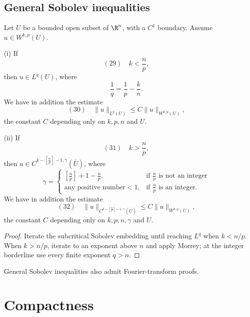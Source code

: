 \subsection{General Sobolev inequalities}

\begin{theorem}
\label{thm:general-sobolev-inequalities}
Let $U$ be a bounded open subset of $\R^n$, with a $C^1$ boundary. Assume $u \in W^{k,p}(U)$.

(i) If
$$(29) \quad k < \frac{n}{p},$$
then $u \in L^q(U)$, where
$$\frac{1}{q} = \frac{1}{p} - \frac{k}{n}.$$
We have in addition the estimate
$$(30) \quad \|u\|_{L^q(U)} \le C\|u\|_{W^{k,p}(U)},$$
the constant $C$ depending only on $k, p, n$ and $U$.

(ii) If
$$(31) \quad k > \frac{n}{p},$$
then $u \in C^{k-[\frac{n}{p}]-1,\gamma}(\bar{U})$, where
$$\gamma = \begin{cases}
\left[\frac{n}{p}\right] + 1 - \frac{n}{p}, & \text{if } \frac{n}{p} \text{ is not an integer} \\
\text{any positive number} < 1, & \text{if } \frac{n}{p} \text{ is an integer}.
\end{cases}$$
We have in addition the estimate
$$(32) \quad \|u\|_{C^{k-[\frac{n}{p}]-1,\gamma}(\bar{U})} \le C\|u\|_{W^{k,p}(U)},$$
the constant $C$ depending only on $k, p, n, \gamma$ and $U$.
\end{theorem}

\begin{proof}
\sketch Iterate the subcritical Sobolev embedding until reaching $L^q$ when $k<n/p$. When $k>n/p$, iterate to an exponent above $n$ and apply Morrey; at the integer borderline use every finite exponent $q>n$.
\end{proof}

\begin{remark}
\label{rem:general-sobolev-fourier-remark}
General Sobolev inequalities also admit Fourier-transform proofs.
\end{remark}

\section{Compactness}
\label{sec:sobolev-compactness}

